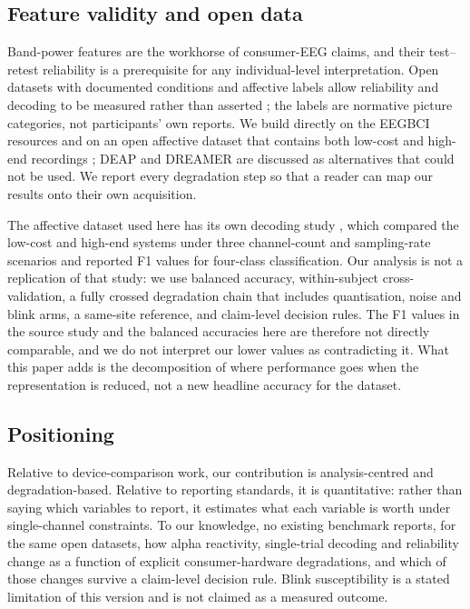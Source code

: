 \subsection*{Feature validity and open data}
Band-power features are the workhorse of consumer-EEG claims, and their test--retest
reliability is a prerequisite for any individual-level interpretation. Open datasets
with documented conditions and affective labels allow reliability and decoding to be
measured rather than asserted \citep{schalk2009eegbci,koelstra2012deap}; the labels are
normative picture categories, not participants' own reports. We build directly on the EEGBCI resources and
on an open affective dataset that contains both low-cost and high-end recordings
\citep{sanchezreolid2022emotion,sanchezreolid2025dataset}; DEAP and DREAMER are discussed
as alternatives that could not be used. We report every degradation step so that a
reader can map our results onto their own acquisition.

The affective dataset used here has its own decoding study
\citep{sanchezreolid2022emotion}, which compared the low-cost and high-end systems under
three channel-count and sampling-rate scenarios and reported F1 values for four-class
classification. Our analysis is not a replication of that study: we use balanced
accuracy, within-subject cross-validation, a fully crossed degradation chain that
includes quantisation, noise and blink arms, a same-site reference, and claim-level
decision rules. The F1 values in the source study and the balanced accuracies here are
therefore not directly comparable, and we do not interpret our lower values as
contradicting it. What this paper adds is the decomposition of where performance goes
when the representation is reduced, not a new headline accuracy for the dataset.

\subsection*{Positioning}
Relative to device-comparison work, our contribution is analysis-centred and
degradation-based. Relative to reporting standards, it is quantitative: rather than
saying which variables to report, it estimates what each variable is worth under
single-channel constraints. To our knowledge, no existing benchmark reports, for the
same open datasets, how alpha reactivity, single-trial decoding and reliability change
as a function of explicit consumer-hardware degradations, and which of those changes
survive a claim-level decision rule. Blink susceptibility is a stated limitation of this
version and is not claimed as a measured outcome.

